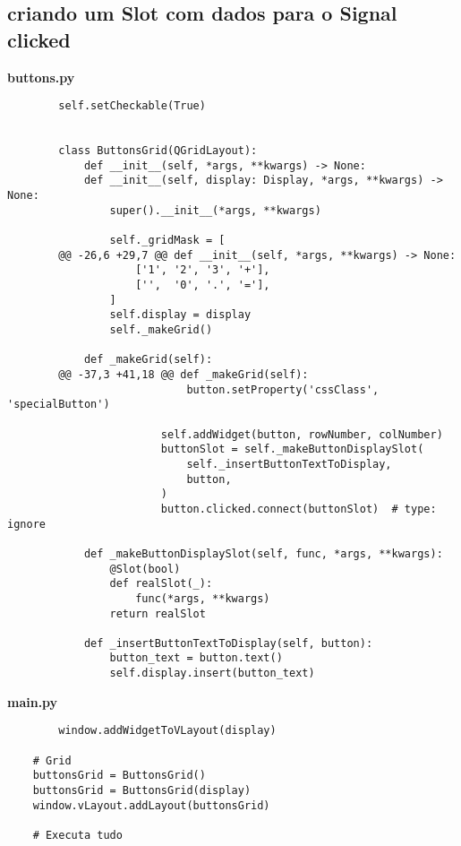 \documentclass[12pt,a4paper]{article}
\begin{document}
    \subsection{criando um Slot com dados para o Signal clicked}
    \textbf{buttons.py}
    \begin{lstlisting}
        self.setCheckable(True)


        class ButtonsGrid(QGridLayout):
            def __init__(self, *args, **kwargs) -> None:
            def __init__(self, display: Display, *args, **kwargs) -> None:
                super().__init__(*args, **kwargs)
        
                self._gridMask = [
        @@ -26,6 +29,7 @@ def __init__(self, *args, **kwargs) -> None:
                    ['1', '2', '3', '+'],
                    ['',  '0', '.', '='],
                ]
                self.display = display
                self._makeGrid()
        
            def _makeGrid(self):
        @@ -37,3 +41,18 @@ def _makeGrid(self):
                            button.setProperty('cssClass', 'specialButton')
        
                        self.addWidget(button, rowNumber, colNumber)
                        buttonSlot = self._makeButtonDisplaySlot(
                            self._insertButtonTextToDisplay,
                            button,
                        )
                        button.clicked.connect(buttonSlot)  # type: ignore
        
            def _makeButtonDisplaySlot(self, func, *args, **kwargs):
                @Slot(bool)
                def realSlot(_):
                    func(*args, **kwargs)
                return realSlot
        
            def _insertButtonTextToDisplay(self, button):
                button_text = button.text()
                self.display.insert(button_text)
    \end{lstlisting}

    \textbf{main.py}
    \begin{lstlisting}
        window.addWidgetToVLayout(display)

    # Grid
    buttonsGrid = ButtonsGrid()
    buttonsGrid = ButtonsGrid(display)
    window.vLayout.addLayout(buttonsGrid)

    # Executa tudo
    \end{lstlisting}

    
\end{document}
